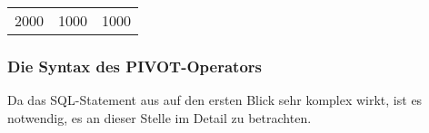         \begin{center}
          \begin{small}
            \tablehead{}

            \begin{mssql}
              \begin{supertabular}{lll}
                2000 & 1000 & 1000 \\
              \end{supertabular}
            \end{mssql}
          \end{small}
        \end{center}
        \subsubsection{Die Syntax des PIVOT-Operators}
          Da das SQL-Statement aus  auf den ersten Blick sehr komplex wirkt, ist es notwendig, es an dieser Stelle im Detail zu betrachten.


